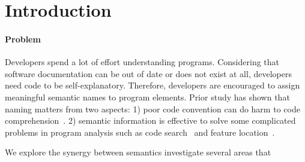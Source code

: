 \section{Introduction}

\paragraph{Problem} 


Developers spend a lot of effort understanding programs. Considering that software documentation can be out of date or does not exist at all, developers need code to be self-explanatory. Therefore, developers are encouraged to assign meaningful semantic names to program elements. Prior study has shown that naming matters from two aspects: 1) poor code convention can do harm to code comprehension~\cite{buse:readability, butler:csmr10, boogerd:icsm08}. 2)  semantic information is effective to solve some complicated problems in program analysis such as code search~\cite{Denys:portfolio11,  lopes:usageSimFSE10, RecoDoc:ICSE12} and   feature location~\cite{Denys:TSE12, sniafl:TSE06, Hill:locateConcern07}. 

We explore the synergy between semantics   investigate several areas that 








